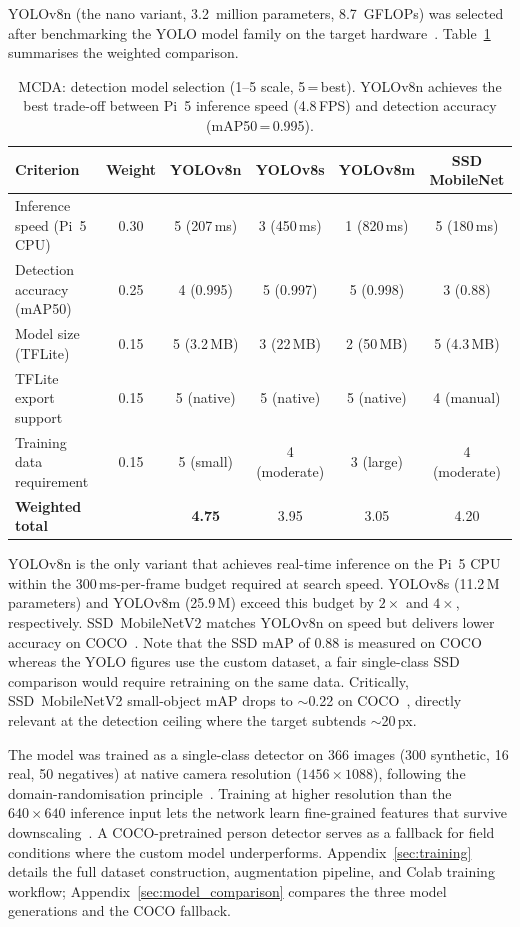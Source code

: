 YOLOv8n (the nano variant, 3.2~million parameters, 8.7~GFLOPs) was selected after benchmarking the YOLO model family on the target hardware~\cite{yolov8}. Table~\ref{tab:mcda-model} summarises the weighted comparison.

\begin{table}[H]
  \centering\compactTable
  \caption{MCDA: detection model selection (1--5 scale, 5\,=\,best).  YOLOv8n achieves the best trade-off between Pi~5 inference speed (4.8\,FPS) and detection accuracy (mAP50\,=\,0.995).}
  \label{tab:mcda-model}
  \begin{tabularx}{\textwidth}{X c c c c c}
    \toprule
    \textbf{Criterion} & \textbf{Weight} & \textbf{YOLOv8n} & \textbf{YOLOv8s} & \textbf{YOLOv8m} & \textbf{SSD MobileNet} \\
    \midrule
    Inference speed (Pi~5 CPU)   & 0.30 & 5 (207\,ms) & 3 (450\,ms) & 1 (820\,ms) & 5 (180\,ms) \\
    Detection accuracy (mAP50)   & 0.25 & 4 (0.995)   & 5 (0.997)   & 5 (0.998)   & 3 (0.88) \\
    Model size (TFLite)          & 0.15 & 5 (3.2\,MB) & 3 (22\,MB)  & 2 (50\,MB)  & 5 (4.3\,MB) \\
    TFLite export support        & 0.15 & 5 (native)  & 5 (native)  & 5 (native)  & 4 (manual) \\
    Training data requirement    & 0.15 & 5 (small)   & 4 (moderate)& 3 (large)   & 4 (moderate) \\
    \midrule
    \textbf{Weighted total}      &      & \textbf{4.75} & 3.95       & 3.05        & 4.20 \\
    \bottomrule
  \end{tabularx}
\end{table}

\noindent YOLOv8n is the only variant that achieves real-time inference on the Pi~5 CPU within the 300\,ms-per-frame budget required at search speed. YOLOv8s (11.2\,M parameters) and YOLOv8m (25.9\,M) exceed this budget by $2\times$ and $4\times$, respectively. SSD~MobileNetV2 matches YOLOv8n on speed but delivers lower accuracy on COCO~\cite{lin2014coco}. Note that the SSD mAP of 0.88 is measured on COCO whereas the YOLO figures use the custom dataset, a fair single-class SSD comparison would require retraining on the same data. Critically, SSD~MobileNetV2 small-object mAP drops to ${\sim}$0.22 on COCO~\cite{edgeai}, directly relevant at the detection ceiling where the target subtends ${\sim}$20\,px.

The model was trained as a single-class detector on 366 images (300 synthetic, 16 real, 50 negatives) at native camera resolution ($1456 \times 1088$), following the domain-randomisation principle~\cite{domainrand}. Training at higher resolution than the $640 \times 640$ inference input lets the network learn fine-grained features that survive downscaling~\cite{yolov8}. A COCO-pretrained person detector serves as a fallback for field conditions where the custom model underperforms. Appendix~\ref{sec:training} details the full dataset construction, augmentation pipeline, and Colab training workflow; Appendix~\ref{sec:model_comparison} compares the three model generations and the COCO fallback.

